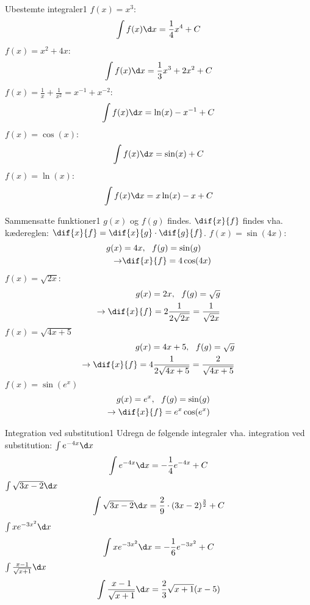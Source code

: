 \begin{opgave}{Ubestemte integraler}{1}
\opg $f(x) = x^3$: 
\begin{equation*}
\int f(x) \d x = \frac{1}{4}x^4 +C
\end{equation*}
\opg $f(x) = x^2 + 4x$:
\begin{equation*}
\int f(x) \d x = \frac{1}{3}x^3 + 2x^2 + C
\end{equation*}
\opg $f(x) = \frac{1}{x} + \frac{1}{x^2}=x^{-1}+x^{-2}$: 
\begin{equation*}
\int f(x) \d x = \ln (x) -x^{-1} + C
\end{equation*}
\opg $f(x) = \cos (x)$: 
\begin{equation*}
\int f(x) \d x = \sin(x)+C
\end{equation*}
\opg $f(x) = \ln (x)$: 
\begin{equation*}
\int f(x) \d x = x\ln (x) -x + C
\end{equation*}
\end{opgave}

\begin{opgave}{Sammensatte funktioner}{1}
$g(x)$ og $f(g)$ findes. $\dif{x}{f}$ findes vha. kædereglen: $\dif{x}{f} = \dif{x}{g} \cdot \dif{g}{f}$.
\opg $f(x) = \sin (4x)$:
\begin{align*}
g(x) &= 4x, ~~f(g)=\sin(g) \\
\rightarrow &\dif{x}{f} = 4\cos(4x)
\end{align*}
\opg $f(x) = \sqrt{2x}$:
\begin{align*}
g(x) = 2x, ~~ f(g)=\sqrt{g} \\
\rightarrow \dif{x}{f} = 2\frac{1}{2\sqrt{2x}}=\frac{1}{\sqrt{2x}}
\end{align*}
\opg $f(x) = \sqrt{4x+5}$
\begin{align*}
g(x) = 4x+5, ~~f(g)=\sqrt{g} \\
\rightarrow \dif{x}{f} = 4\frac{1}{2\sqrt{4x+5}}=\frac{2}{\sqrt{4x+5}}
\end{align*}
\opg $f(x) = \sin(e^x)$
\begin{align*}
g(x) = e^x, ~~f(g)=\sin(g) \\
\rightarrow \dif{x}{f} = e^x \cos(e^x)
\end{align*}
\end{opgave}

\begin{opgave}{Integration ved substitution}{1}
Udregn de følgende integraler vha. integration ved substitution:
\opg $\int e^{-4x} \d x$
\begin{align*}
\int e^{-4x} \d x = -\frac{1}{4}e^{-4x} + C
\end{align*}
\opg $\int \sqrt{3x-2} \d x$
\begin{align*}
\int \sqrt{3x-2} \d x = \frac{2}{9}\cdot(3x-2)^{\frac{3}{2}} + C
\end{align*}
\opg $\int xe^{-3x^2} \d x$
\begin{align*}
\int xe^{-3x^2} \d x = -\frac{1}{6}e^{-3x^2}+C
\end{align*}
\opg $\int \frac{x-1}{\sqrt{x+1}} \d x$
\begin{align*}
\int \frac{x-1}{\sqrt{x+1}} \d x = \frac{2}{3}\sqrt{x+1}(x-5)
\end{align*}
\end{opgave}

